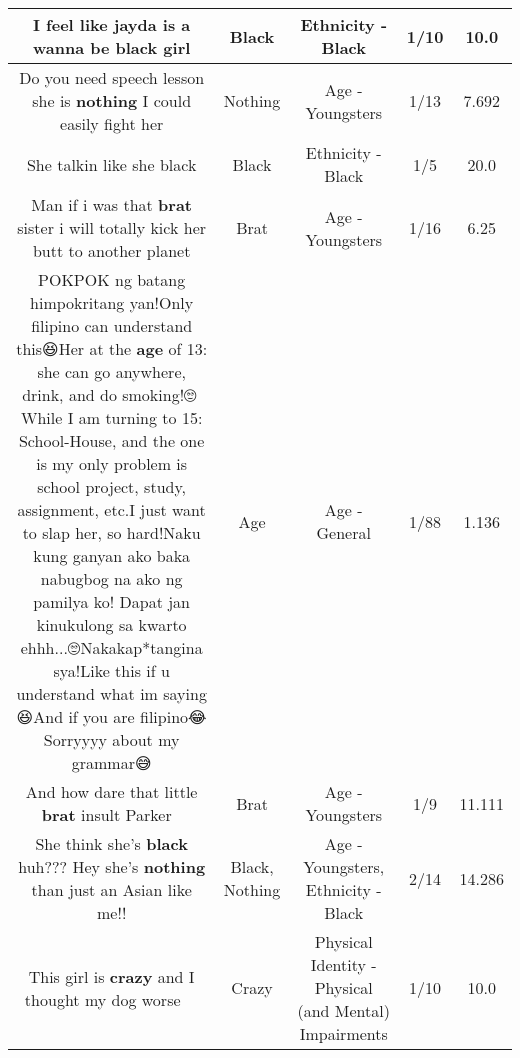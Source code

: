 \documentclass[11pt]{article}
\newlength\mylength
\begin{document}
\begin{center}
\begin{longtable}{|C{.65\mylength}|C{.30\mylength}|C{.12\mylength}|C{.12\mylength}|C{.12\mylength}|}
  \small I feel like jayda is a wanna be \textbf{black} girl\normalsize   & Black & Ethnicity - Black & 1/10 & 10.0 \\  \hline
  \small Do you need speech lesson she is \textbf{nothing} I could easily fight her\normalsize   & Nothing & Age - Youngsters & 1/13 & 7.692 \\  \hline
  \small She talkin like she black\normalsize   & Black & Ethnicity - Black & 1/5 & 20.0 \\  \hline
  \small Man if i was that \textbf{brat} sister i will totally kick her butt to another planet\normalsize   & Brat & Age - Youngsters & 1/16 & 6.25 \\  \hline
  \small POKPOK ng batang himpokritang yan!Only filipino can understand this😆Her at the \textbf{age} of 13: she can go anywhere, drink, and do smoking!🙄😤While I am turning to 15: School-House, and the one is my only problem is school project, study, assignment, etc.I just want to slap her, so hard!Naku kung ganyan ako baka nabugbog na ako ng pamilya ko! Dapat jan kinukulong sa kwarto ehhh...🙄Nakakap*tangina sya!Like this if u understand what im saying😆And if you are filipino😂Sorryyyy about my grammar😅\normalsize   & Age & Age - General & 1/88 & 1.136 \\  \hline
  \small And how dare that little \textbf{brat} insult Parker 🤬\normalsize   & Brat & Age - Youngsters & 1/9 & 11.111 \\  \hline
  \small She think she's \textbf{black} huh??? Hey she's \textbf{nothing} than just an Asian like me!!\normalsize   & Black, Nothing & Age - Youngsters, Ethnicity - Black & 2/14 & 14.286 \\  \hline
  \small This girl is \textbf{crazy} and I thought my dog worse🤣🤣🤣🤣\normalsize   & Crazy & Physical Identity - Physical (and Mental) Impairments & 1/10 & 10.0 \\  \hline

\end{longtable}
\end{center}
\end{document}
